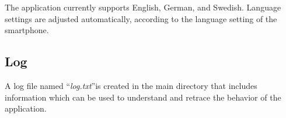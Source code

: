 \documentclass[11pt,a4paper,titlepage]{article}
\begin{document}
The application currently supports English, German, and Swedish. Language settings are adjusted automatically, according to the language setting of the smartphone.


\subsection{Log}


A log file named ``\textit{log.txt}''is created in the main directory that includes information which can be used to understand and retrace the behavior of the application. 

\newpage

\begin{figure}
\vspace{-0.5cm}
		\centering
			\begin{minipage}{0.30\textwidth}

\end{minipage}
\end{figure}
\end{document}
